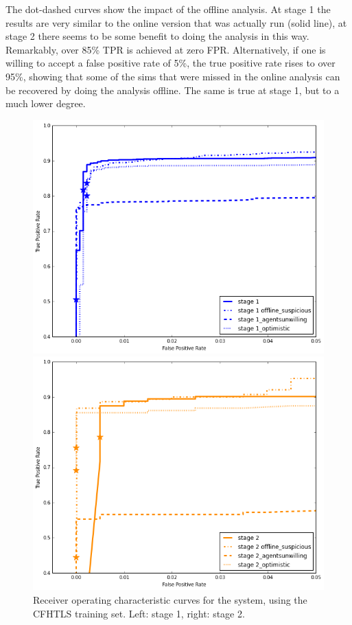 \documentclass[useAMS,usenatbib,a4paper]{mn2e}
\begin{document}
The dot-dashed curves show the impact of the offline analysis. At stage 1 the
results are very similar to the online version that was actually run (solid
line), at stage 2 there seems to be some benefit to doing the analysis in this
way. Remarkably, over 85\% TPR is achieved at zero FPR. Alternatively, if one
is willing to accept a false positive rate of 5\%, the true positive rate
rises to over 95\%, showing that some of the sims that were missed in the
online analysis can be recovered by doing the analysis offline. The same is
true at stage 1, but to a much lower degree.

\begin{figure}
\begin{minipage}{0.45\linewidth}
  \centering\includegraphics[width=\linewidth]{sw-system-figs/stage1_ROC.png}
\end{minipage}\hfill
\begin{minipage}{0.45\linewidth}
  \centering\includegraphics[width=\linewidth]{sw-system-figs/stage2_ROC.png}
\end{minipage}
\caption{Receiver operating characteristic curves for the \sw system, using
the CFHTLS training set. Left: stage 1, right: stage 2.}
\label{fig:results:sample:roc}
\end{figure}
\end{document}
